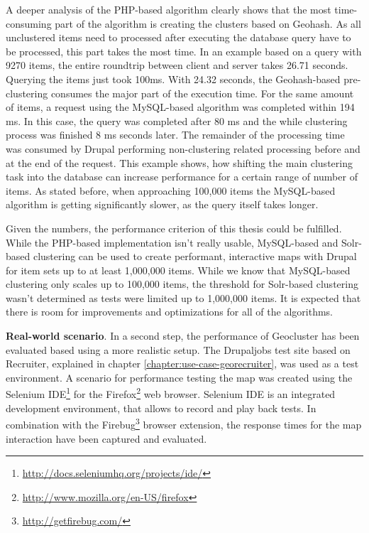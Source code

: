 A deeper analysis of the PHP-based algorithm clearly shows that the most time-consuming part of the algorithm is creating the clusters based on Geohash. As all unclustered items need to processed after executing the database query have to be processed, this part takes the most time. In an example based on a query with 9270 items, the entire roundtrip between client and server takes 26.71 seconds. Querying the items just took 100ms. With 24.32 seconds, the Geohash-based pre-clustering consumes the major part of the execution time. For the same amount of items, a request using the MySQL-based algorithm was completed within 194 ms. In this case, the query was completed after 80 ms and the while clustering process was finished 8 ms seconds later. The remainder of the processing time was consumed by Drupal performing non-clustering related processing before and at the end of the request. This example shows, how shifting the main clustering task into the database can increase performance for a certain range of number of items. As stated before, when approaching 100,000 items the MySQL-based algorithm is getting significantly slower, as the query itself takes longer.

Given the numbers, the performance criterion of this thesis could be fulfilled. While the PHP-based implementation isn't really usable, MySQL-based and Solr-based clustering can be used to create performant, interactive maps with Drupal for item sets up to at least 1,000,000 items. While we know that MySQL-based clustering only scales up to 100,000 items, the threshold for Solr-based clustering wasn't determined as tests were limited up to 1,000,000 items. It is expected that there is room for improvements and optimizations for all of the algorithms.


\textbf{Real-world scenario}. In a second step, the performance of Geocluster has been evaluated based using a more realistic setup. The Drupaljobs test site based on Recruiter, explained in chapter \ref{chapter:use-case-georecruiter}, was used as a test environment. A scenario for performance testing the map was created using the Selenium IDE\footnote{\url{http://docs.seleniumhq.org/projects/ide/}} for the Firefox\footnote{\url{http://www.mozilla.org/en-US/firefox}} web browser. Selenium IDE is an integrated development environment, that allows to record and play back tests. In combination with the Firebug\footnote{\url{http://getfirebug.com/}} browser extension, the response times for the map interaction have been captured and evaluated.

